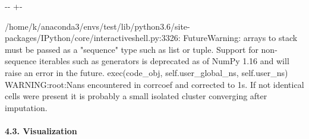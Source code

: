 \documentclass[letterpaper,10pt,english]{sphinxmanual}
\newlength\nbsphinxcodecellspacing
\begin{document}
{

\kern-\sphinxverbatimsmallskipamount\kern-\baselineskip
\kern+\FrameHeightAdjust\kern-\fboxrule
\vspace{\nbsphinxcodecellspacing}

\begin{sphinxVerbatim}[commandchars=\\\{\}]
/home/k/anaconda3/envs/test/lib/python3.6/site-packages/IPython/core/interactiveshell.py:3326: FutureWarning: arrays to stack must be passed as a "sequence" type such as list or tuple. Support for non-sequence iterables such as generators is deprecated as of NumPy 1.16 and will raise an error in the future.
  exec(code\_obj, self.user\_global\_ns, self.user\_ns)
WARNING:root:Nans encountered in corrcoef and corrected to 1s. If not identical cells were present it is probably a small isolated cluster converging after imputation.
\end{sphinxVerbatim}
}


\paragraph{4.3. Visualization}
\label{\detokenize{notebooks/05_simulation/Gata1_KO_simulation_with_with_Paul_etal_2015_data:4.3.-Visualization}}
\end{document}
